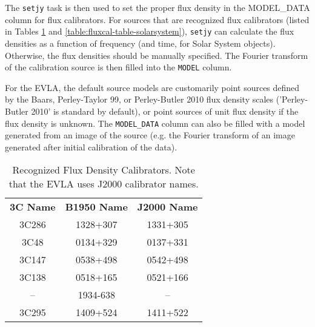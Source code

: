 The {\tt setjy} task is then used to set the proper flux density in
the MODEL\_DATA column for flux calibrators. For sources that are
recognized flux calibrators (listed in Tables
\ref{table:fluxcal-table} and \ref{table:fluxcal-table-solarsystem}),
{\tt setjy} can calculate the flux densities as a function of
frequency (and time, for Solar System objects).  Otherwise, the flux
densities should be manually specified.  The Fourier transform of the
calibration source is then filled into the {\tt MODEL} column.

For the EVLA, the default source models are customarily point sources
defined by the Baars, Perley-Taylor 99, or Perley-Butler 2010 flux density
scales ('Perley-Butler 2010' is standard by default),
or point sources of unit flux density if the flux density is
unknown. The {\tt MODEL\_DATA} column can also be filled with a model
generated from an image of the source (e.g. the Fourier transform of
an image generated after initial calibration of the data).

\vspace{5mm}
\begin{table}[h!]
\caption{Recognized Flux Density Calibrators. Note that the EVLA uses
J2000 calibrator names.
        {\label{table:fluxcal-table}}}
\begin{center}
\begin{tabular}{|ccc|} \hline
{\bf 3C Name}  & {\bf B1950 Name}& {\bf J2000 Name} \\
  3C286        &  1328+307       &  1331+305        \\
  3C48         &  0134+329       &  0137+331        \\
  3C147        &  0538+498       &  0542+498        \\
  3C138        &  0518+165       &  0521+166        \\
  --           &  1934-638       &    --            \\
  3C295        &  1409+524       &  1411+522        \\
\hline
\end{tabular}
\end{center}
\end{table}


